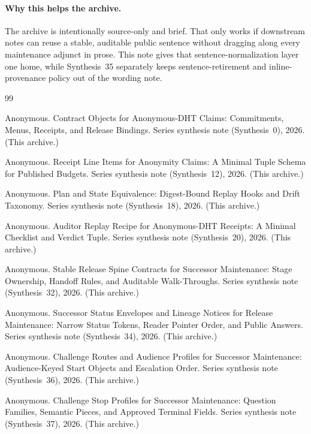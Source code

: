 \documentclass[11pt]{article}
\begin{document}
\paragraph{Why this helps the archive.}
The archive is intentionally source-only and brief.
That only works if downstream notes can reuse a stable, auditable public sentence without dragging along every maintenance adjunct in prose.
This note gives that sentence-normalization layer one home, while Synthesis~35 separately keeps sentence-retirement and inline-provenance policy out of the wording note.

\begin{thebibliography}{99}\small

Anonymous.
\newblock Contract Objects for Anonymous-DHT Claims: Commitments, Menus, Receipts, and Release Bindings.
\newblock Series synthesis note (Synthesis~0), 2026. (This archive.)

Anonymous.
\newblock Receipt Line Items for Anonymity Claims: A Minimal Tuple Schema for Published Budgets.
\newblock Series synthesis note (Synthesis~12), 2026. (This archive.)

Anonymous.
\newblock Plan and State Equivalence: Digest-Bound Replay Hooks and Drift Taxonomy.
\newblock Series synthesis note (Synthesis~18), 2026. (This archive.)

Anonymous.
\newblock Auditor Replay Recipe for Anonymous-DHT Receipts: A Minimal Checklist and Verdict Tuple.
\newblock Series synthesis note (Synthesis~20), 2026. (This archive.)

Anonymous.
\newblock Stable Release Spine Contracts for Successor Maintenance: Stage Ownership, Handoff Rules, and Auditable Walk-Throughs.
\newblock Series synthesis note (Synthesis~32), 2026. (This archive.)

Anonymous.
\newblock Successor Status Envelopes and Lineage Notices for Release Maintenance: Narrow Status Tokens, Reader Pointer Order, and Public Answers.
\newblock Series synthesis note (Synthesis~34), 2026. (This archive.)

Anonymous.
\newblock Challenge Routes and Audience Profiles for Successor Maintenance: Audience-Keyed Start Objects and Escalation Order.
\newblock Series synthesis note (Synthesis~36), 2026. (This archive.)

Anonymous.
\newblock Challenge Stop Profiles for Successor Maintenance: Question Families, Semantic Pieces, and Approved Terminal Fields.
\newblock Series synthesis note (Synthesis~37), 2026. (This archive.)


\end{thebibliography}
\end{document}
